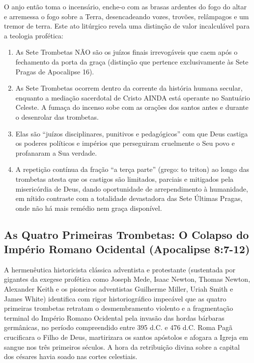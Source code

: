 O anjo então toma o incensário, enche-o com as brasas ardentes do fogo do altar e arremessa o fogo sobre a Terra, desencadeando vozes, trovões, relâmpagos e um tremor de terra.
Este ato litúrgico revela uma distinção de valor incalculável para a teologia profética:
\begin{enumerate}
  \item As Sete Trombetas NÃO são os juízos finais irrevogáveis que caem após o fechamento da porta da graça (distinção que pertence exclusivamente às Sete Pragas de Apocalipse 16).
  \item As Sete Trombetas ocorrem dentro da corrente da história humana secular, enquanto a mediação sacerdotal de Cristo AINDA está operante no Santuário Celeste. A fumaça do incenso sobe com as orações dos santos antes e durante o desenrolar das trombetas.
  \item Elas são ``juízos disciplinares, punitivos e pedagógicos'' com que Deus castiga os poderes políticos e impérios que perseguiram cruelmente o Seu povo e profanaram a Sua verdade.
  \item A repetição contínua da fração ``a terça parte'' (grego: to triton) ao longo das trombetas atesta que os castigos são limitados, parciais e mitigados pela misericórdia de Deus, dando oportunidade de arrependimento à humanidade, em nítido contraste com a totalidade devastadora das Sete Últimas Pragas, onde não há mais remédio nem graça disponível.
\end{enumerate}




\subsection{As Quatro Primeiras Trombetas: O Colapso do Império Romano Ocidental (Apocalipse 8:7-12)}


A hermenêutica historicista clássica adventista e protestante (sustentada por gigantes da exegese profética como Joseph Mede, Isaac Newton, Thomas Newton, Alexander Keith e os pioneiros adventistas Guilherme Miller, Uriah Smith e James White) identifica com rigor historiográfico impecável que as quatro primeiras trombetas retratam o desmembramento violento e a fragmentação terminal do Império Romano Ocidental pela invasão das hordas bárbaras germânicas, no período compreendido entre 395 d.C. e 476 d.C.
Roma Pagã crucificara o Filho de Deus, martirizara os santos apóstolos e afogara a Igreja em sangue nos três primeiros séculos. A hora da retribuição divina sobre a capital dos césares havia soado nas cortes celestiais.


